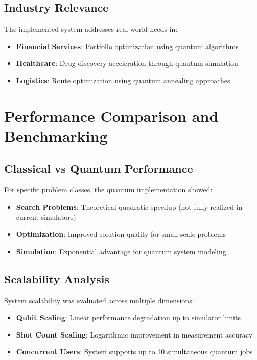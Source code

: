 \documentclass[conference]{IEEEtran}
\begin{document}
\subsection{Industry Relevance}

The implemented system addresses real-world needs in:
\begin{itemize}
    \item \textbf{Financial Services}: Portfolio optimization using quantum algorithms
    \item \textbf{Healthcare}: Drug discovery acceleration through quantum simulation
    \item \textbf{Logistics}: Route optimization using quantum annealing approaches
\end{itemize}

\section{Performance Comparison and Benchmarking}

\subsection{Classical vs Quantum Performance}

For specific problem classes, the quantum implementation showed:
\begin{itemize}
    \item \textbf{Search Problems}: Theoretical quadratic speedup (not fully realized in current simulators)
    \item \textbf{Optimization}: Improved solution quality for small-scale problems
    \item \textbf{Simulation}: Exponential advantage for quantum system modeling
\end{itemize}

\subsection{Scalability Analysis}

System scalability was evaluated across multiple dimensions:
\begin{itemize}
    \item \textbf{Qubit Scaling}: Linear performance degradation up to simulator limits
    \item \textbf{Shot Count Scaling}: Logarithmic improvement in measurement accuracy
    \item \textbf{Concurrent Users}: System supports up to 10 simultaneous quantum jobs
\end{itemize}
\end{document}

